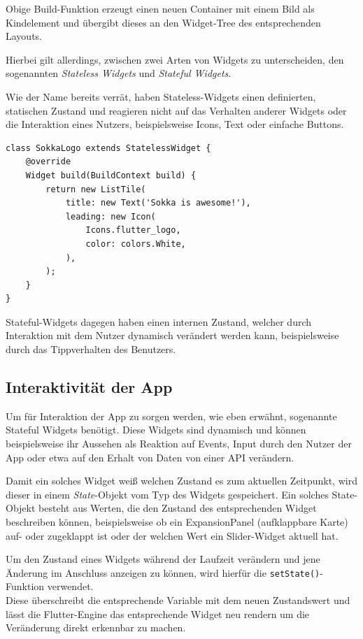 Obige Build-Funktion erzeugt einen neuen Container mit einem Bild als Kindelement und übergibt dieses
an den Widget-Tree des entsprechenden Layouts.

Hierbei gilt allerdings, zwischen zwei Arten von Widgets zu unterscheiden, den sogenannten \textit{Stateless Widgets}
und \textit{Stateful Widgets}.

Wie der Name bereits verrät, haben Stateless-Widgets einen definierten, statischen Zustand und reagieren nicht
auf das Verhalten anderer Widgets oder die Interaktion eines Nutzers, beispielsweise Icons, Text oder einfache
Buttons.

\begin{lstlisting}
class SokkaLogo extends StatelessWidget {
    @override
    Widget build(BuildContext build) {
        return new ListTile(
            title: new Text('Sokka is awesome!'),
            leading: new Icon(
                Icons.flutter_logo,
                color: colors.White,
            ),
        );
    }
}
\end{lstlisting}

Stateful-Widgets dagegen haben einen internen Zustand, welcher durch Interaktion mit dem Nutzer dynamisch verändert
werden kann, beispielsweise durch das Tippverhalten des Benutzers.

\subsection{Interaktivität der App}


Um für Interaktion der App zu sorgen werden, wie eben erwähnt, sogenannte Stateful Widgets benötigt.
Diese Widgets sind dynamisch und können beispielsweise ihr Aussehen als Reaktion auf Events, Input durch
den Nutzer der App oder etwa auf den Erhalt von Daten von einer API verändern.

Damit ein solches Widget weiß welchen Zustand es zum aktuellen Zeitpunkt, wird dieser in einem \textit{State}-Objekt vom Typ
des Widgets gespeichert. Ein solches State-Objekt besteht aus Werten, die den Zustand des entsprechenden Widget beschreiben können,
beispielsweise ob ein ExpansionPanel (aufklappbare Karte) auf- oder zugeklappt ist oder der welchen Wert ein Slider-Widget
aktuell hat.

Um den Zustand eines Widgets während der Laufzeit verändern und jene Änderung im Anschluss anzeigen zu können,
wird hierfür die \lstinline{setState()}-Funktion verwendet.\\
Diese überschreibt die entsprechende Variable mit dem neuen Zustandswert und lässt die Flutter-Engine das entsprechende
Widget neu rendern um die Veränderung direkt erkennbar zu machen.

